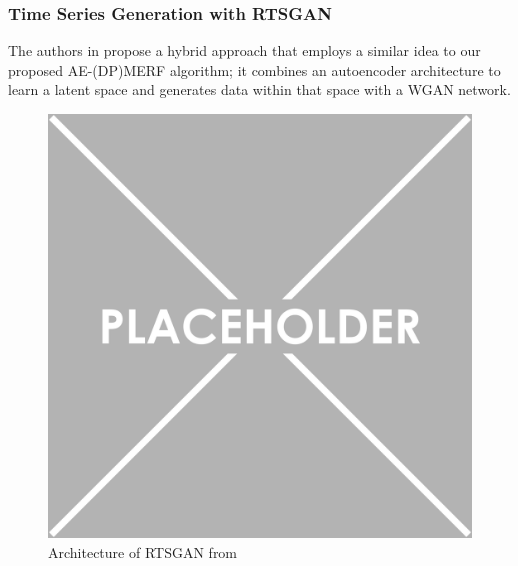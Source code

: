 \subsubsection{Time Series Generation with RTSGAN}
The authors in \parencite{pei2021towards} propose a hybrid approach that employs a similar idea to our proposed AE-(DP)MERF algorithm; it combines an autoencoder architecture to learn a latent space and generates data within that space with a WGAN network.

\begin{figure}[h]
    \centering
    \includegraphics[scale=0.5]{../images/placeholder.png}
    \caption{Architecture of RTSGAN from \parencite{pei2021towards}}
    \label{fig:rtsgan_arch}
\end{figure}

